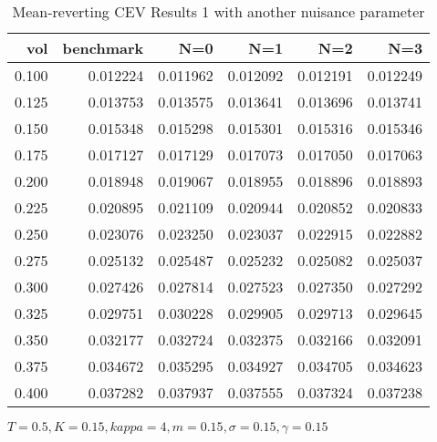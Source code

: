 \begin{table}[ht]
  \centering
  \caption{Mean-reverting CEV Results 1 with another nuisance parameter}
  \begin{tabular}{rrrrrr}
  \toprule
    vol &       benchmark &       N=0 &       N=1 &       N=2 &       N=3 \\
  \midrule
  0.100 & 0.012224 & 0.011962 & 0.012092 & 0.012191 & 0.012249 \\
  0.125 & 0.013753 & 0.013575 & 0.013641 & 0.013696 & 0.013741 \\
  0.150 & 0.015348 & 0.015298 & 0.015301 & 0.015316 & 0.015346 \\
  0.175 & 0.017127 & 0.017129 & 0.017073 & 0.017050 & 0.017063 \\
  0.200 & 0.018948 & 0.019067 & 0.018955 & 0.018896 & 0.018893 \\
  0.225 & 0.020895 & 0.021109 & 0.020944 & 0.020852 & 0.020833 \\
  0.250 & 0.023076 & 0.023250 & 0.023037 & 0.022915 & 0.022882 \\
  0.275 & 0.025132 & 0.025487 & 0.025232 & 0.025082 & 0.025037 \\
  0.300 & 0.027426 & 0.027814 & 0.027523 & 0.027350 & 0.027292 \\
  0.325 & 0.029751 & 0.030228 & 0.029905 & 0.029713 & 0.029645 \\
  0.350 & 0.032177 & 0.032724 & 0.032375 & 0.032166 & 0.032091 \\
  0.375 & 0.034672 & 0.035295 & 0.034927 & 0.034705 & 0.034623 \\
  0.400 & 0.037282 & 0.037937 & 0.037555 & 0.037324 & 0.037238 \\
  \bottomrule
  \end{tabular}
  \small{$T=0.5,K=0.15, kappa = 4,m=0.15, \sigma = 0.15, \gamma = 0.15$}
\end{table}

